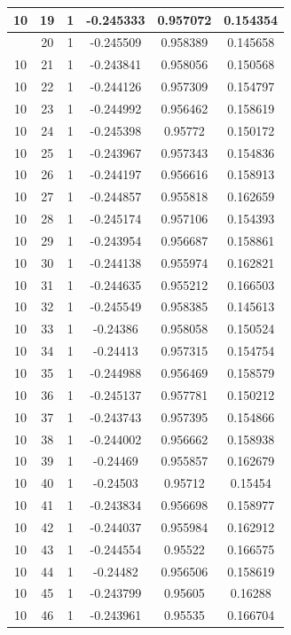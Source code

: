 \documentclass[12pt,a4paper]{article}
\numberwithin{equation}{section}
\numberwithin{figure}{section}
\numberwithin{table}{section}
\begin{document}
\begin{longtable}{|c|c|c|c|c|c|}
10 & 19 & 1 & -0.245333 & 0.957072 & 0.154354 \\ \hline
\pagebreak
10 & 20 & 1 & -0.245509 & 0.958389 & 0.145658 \\ \hline
10 & 21 & 1 & -0.243841 & 0.958056 & 0.150568 \\ \hline
10 & 22 & 1 & -0.244126 & 0.957309 & 0.154797 \\ \hline
10 & 23 & 1 & -0.244992 & 0.956462 & 0.158619 \\ \hline
10 & 24 & 1 & -0.245398 & 0.95772 & 0.150172 \\ \hline
10 & 25 & 1 & -0.243967 & 0.957343 & 0.154836 \\ \hline
10 & 26 & 1 & -0.244197 & 0.956616 & 0.158913 \\ \hline
10 & 27 & 1 & -0.244857 & 0.955818 & 0.162659 \\ \hline
10 & 28 & 1 & -0.245174 & 0.957106 & 0.154393 \\ \hline
10 & 29 & 1 & -0.243954 & 0.956687 & 0.158861 \\ \hline
10 & 30 & 1 & -0.244138 & 0.955974 & 0.162821 \\ \hline
10 & 31 & 1 & -0.244635 & 0.955212 & 0.166503 \\ \hline
10 & 32 & 1 & -0.245549 & 0.958385 & 0.145613 \\ \hline
10 & 33 & 1 & -0.24386 & 0.958058 & 0.150524 \\ \hline
10 & 34 & 1 & -0.24413 & 0.957315 & 0.154754 \\ \hline
10 & 35 & 1 & -0.244988 & 0.956469 & 0.158579 \\ \hline
10 & 36 & 1 & -0.245137 & 0.957781 & 0.150212 \\ \hline
10 & 37 & 1 & -0.243743 & 0.957395 & 0.154866 \\ \hline
10 & 38 & 1 & -0.244002 & 0.956662 & 0.158938 \\ \hline
10 & 39 & 1 & -0.24469 & 0.955857 & 0.162679 \\ \hline
10 & 40 & 1 & -0.24503 & 0.95712 & 0.15454 \\ \hline
10 & 41 & 1 & -0.243834 & 0.956698 & 0.158977 \\ \hline
10 & 42 & 1 & -0.244037 & 0.955984 & 0.162912 \\ \hline
10 & 43 & 1 & -0.244554 & 0.95522 & 0.166575 \\ \hline
10 & 44 & 1 & -0.24482 & 0.956506 & 0.158619 \\ \hline
10 & 45 & 1 & -0.243799 & 0.95605 & 0.16288 \\ \hline
10 & 46 & 1 & -0.243961 & 0.95535 & 0.166704 \\ \hline

\end{longtable}
\end{document}
